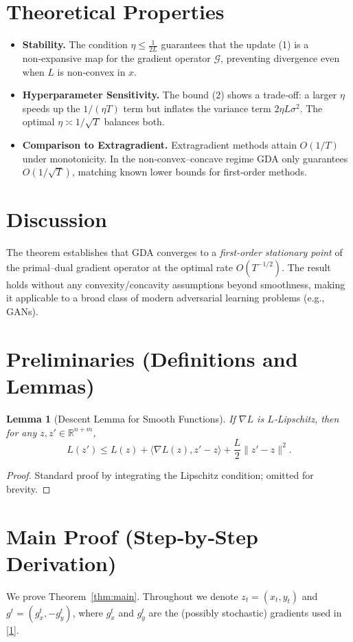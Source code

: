 \documentclass{article}
\newtheorem{lemma}{Lemma}
\newcommand{\R}{\mathbb{R}}
\begin{document}
\section*{Theoretical Properties}
\begin{itemize}[leftmargin=*]
\item \textbf{Stability.} The condition $\eta\le \frac{1}{2L}$ guarantees that the update (1) is a non‑expansive map for the gradient operator $\mathcal{G}$, preventing divergence even when $L$ is non‑convex in $x$.
\item \textbf{Hyperparameter Sensitivity.} The bound (2) shows a trade‑off: a larger $\eta$ speeds up the $1/(\eta T)$ term but inflates the variance term $2\eta L\sigma^{2}$. The optimal $\eta\asymp 1/\sqrt{T}$ balances both.
\item \textbf{Comparison to Extragradient.} Extragradient methods attain $O(1/T)$ under monotonicity. In the non‑convex–concave regime GDA only guarantees $O(1/\sqrt{T})$, matching known lower bounds for first‑order methods.
\end{itemize}

\section*{Discussion}
The theorem establishes that GDA converges to a \emph{first‑order stationary point} of the primal–dual gradient operator at the optimal rate $O(T^{-1/2})$. The result holds without any convexity/concavity assumptions beyond smoothness, making it applicable to a broad class of modern adversarial learning problems (e.g., GANs).

\section*{Preliminaries (Definitions and Lemmas)}
\begin{lemma}[Descent Lemma for Smooth Functions]\label{lem:descent}
If $\nabla L$ is $L$‑Lipschitz, then for any $z,z'\in\R^{n+m}$,
\[
L(z')\le L(z)+\langle\nabla L(z),z'-z\rangle+\frac{L}{2}\|z'-z\|^{2}.
\]
\end{lemma}
\begin{proof}
Standard proof by integrating the Lipschitz condition; omitted for brevity. \qedhere
\end{proof}

\section*{Main Proof (Step‑by‑Step Derivation)}
We prove Theorem~\ref{thm:main}. Throughout we denote $z_{t}=(x_{t},y_{t})$ and $g^{t}= (g_{x}^{t},-g_{y}^{t})$, where $g_{x}^{t}$ and $g_{y}^{t}$ are the (possibly stochastic) gradients used in \eqref{1}.  
\end{document}
